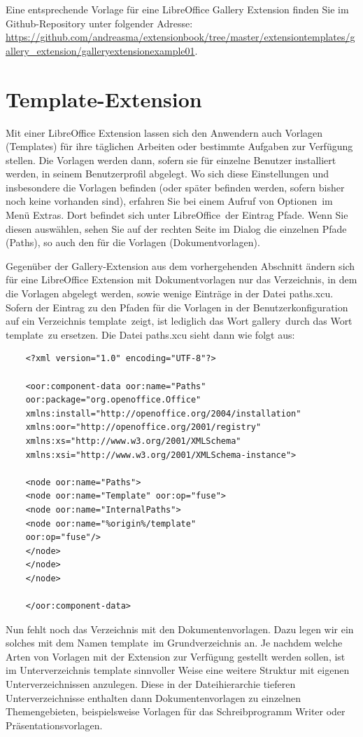 \documentclass[12pt,a4paper,titlepage]{book}
\begin{document}
Eine entsprechende Vorlage für eine LibreOffice Gallery Extension finden Sie im Github-Repository unter folgender Adresse:\linebreak
\url{https://github.com/andreasma/extensionbook/tree/master/extensiontemplates/gallery_extension/galleryextensionexample01}.

\section{Template-Extension}

Mit einer LibreOffice Extension lassen sich den Anwendern auch Vorlagen (Templates) für ihre täglichen Arbeiten oder bestimmte Aufgaben zur Verfügung stellen. Die Vorlagen werden dann, sofern sie für einzelne Benutzer installiert werden, in seinem Benutzerprofil abgelegt. Wo sich diese Einstellungen und insbesondere die Vorlagen befinden (oder später befinden werden, sofern bisher noch keine vorhanden sind), erfahren Sie bei einem Aufruf von \glqq Optionen\grqq~im Menü \glqq Extras\grqq. Dort befindet sich unter \glqq LibreOffice\grqq~der Eintrag \glqq Pfade\grqq. Wenn Sie diesen auswählen, sehen Sie auf der rechten Seite im Dialog die einzelnen Pfade (Paths), so auch den für die Vorlagen (\glqq Dokumentvorlagen\grqq).

Gegenüber der Gallery-Extension aus dem vorhergehenden Abschnitt ändern sich für  eine LibreOffice Extension mit Dokumentvorlagen nur das Verzeichnis, in dem die Vorlagen abgelegt werden, sowie wenige Einträge in der Datei \glqq paths.xcu\grqq. Sofern der Eintrag zu den Pfaden für die Vorlagen in der Benutzerkonfiguration auf ein Verzeichnis \glqq template\grqq~zeigt, ist lediglich das Wort \glqq gallery\grqq~durch das Wort \glqq template\grqq~zu ersetzen. Die Datei paths.xcu sieht dann wie folgt aus:

\begin{lstlisting}
	<?xml version="1.0" encoding="UTF-8"?>
	
	<oor:component-data oor:name="Paths" 
	oor:package="org.openoffice.Office" 
	xmlns:install="http://openoffice.org/2004/installation" 
	xmlns:oor="http://openoffice.org/2001/registry"
	xmlns:xs="http://www.w3.org/2001/XMLSchema" 
	xmlns:xsi="http://www.w3.org/2001/XMLSchema-instance">
	
	<node oor:name="Paths">
	<node oor:name="Template" oor:op="fuse">
	<node oor:name="InternalPaths">
	<node oor:name="%origin%/template" 
	oor:op="fuse"/>
	</node>
	</node>
	</node>
	
	</oor:component-data>
\end{lstlisting}
Nun fehlt noch das Verzeichnis mit den Dokumentenvorlagen. Dazu legen wir ein solches mit dem Namen \glqq template\grqq~im Grundverzeichnis an. Je nachdem welche Arten von Vorlagen mit der Extension zur Verfügung gestellt werden sollen, ist im Unterverzeichnis template sinnvoller Weise eine weitere Struktur mit eigenen Unterverzeichnissen anzulegen. Diese in der Dateihierarchie tieferen Unterverzeichnisse enthalten dann Dokumentenvorlagen zu einzelnen Themengebieten, beispielsweise Vorlagen für das Schreibprogramm Writer oder Präsentationsvorlagen.
\end{document}
